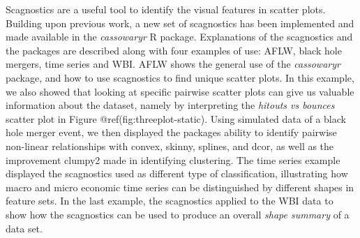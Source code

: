 Scagnostics are a useful tool to identify the visual features in scatter
plots. Building upon previous work, a new set of scagnostics has been
implemented and made available in the \emph{cassowaryr} R package.
Explanations of the scagnostics and the packages are described along
with four examples of use: AFLW, black hole mergers, time series and
WBI. AFLW shows the general use of the \emph{cassowaryr} package, and
how to use scagnostics to find unique scatter plots. In this example, we
also showed that looking at specific pairwise scatter plots can give us
valuable information about the dataset, namely by interpreting the
\emph{hitouts vs bounces} scatter plot in Figure
@ref(fig:threeplot-static). Using simulated data of a black hole merger
event, we then displayed the packages ability to identify pairwise
non-linear relationships with convex, skinny, splines, and dcor, as well
as the improvement clumpy2 made in identifying clustering. The time
series example displayed the scagnostics used as different type of
classification, illustrating how macro and micro economic time series
can be distinguished by different shapes in feature sets. In the last
example, the scagnostics applied to the WBI data to show how the
scagnostics can be used to produce an overall \emph{shape summary} of a
data set.

